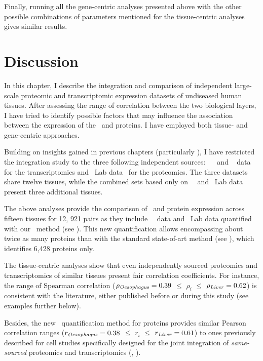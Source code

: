 Finally, running all the gene-centric analyses presented above
with the other possible combinations of parameters
mentioned for the tissue-centric analyses
gives similar results.\mybr\

\vspace{-2mm}
\section{Discussion}
\vspace{-2mm}

In this chapter,
I describe the integration and comparison of independent large-scale
proteomic and transcriptomic expression datasets
of undiseased human tissues.
After assessing the range of correlation between the two biological layers,
I have tried to identify possible factors
that may influence the association
between the expression of the \mRNAs\ and proteins.
I have employed both tissue- and gene-centric approaches.\mybr\

Building on insights gained in previous chapters
(particularly ),
I have restricted the integration study to
the three following independent sources:
\uhlen\ \etal{}~
and \gtex~ data for the transcriptomics
and \pandey\ Lab data~ for the proteomics.
The three datasets share twelve tissues,
while the combined sets based only on \uhlen\ \etal\ and \pandey\ Lab data
present three additional tissues.\mybr\

The above analyses provide
the comparison of \mRNA\ and protein expression across fifteen tissues
for 12, 921 pairs as they include \uhlen\ \etal\ data and \pandey\ Lab data
quantified with our \PPKM\ method (see ).
This new quantification allows encompassing about twice as many proteins
than with the standard state-of-art method (see ),
which identifies 6,428 proteins only.\mybr\

The tissue-centric analyses show that
even independently sourced proteomics and transcriptomics of similar tissues
present fair correlation coefficients.
For instance, the range of Spearman correlation
($\rho_{\text{\emph{Oesophagus}}}=0.39$
$≤$ $\rho_i$ $≤$ $\rho_{\text{\emph{Liver}}}=0.62$)
is consistent with the literature,
either published before or during this study (see examples further below).\mybr\

Besides, the new \PPKM\ quantification method for proteins
provides similar Pearson correlation ranges
($r_{\text{\emph{Oesophagus}}}=0.38$ $≤$ $r_i$  $≤$ $r_{\text{\emph{Liver}}}=0.61$)
to ones previously described for cell studies specifically designed
for the joint integration of \emph{same-sourced} proteomics and transcriptomics
(\eg, \citet{Marguerat2012-sn,schwanhausserglobal:2011,Schwanhausser2013-et,Li2014-ai}).\mybr\

